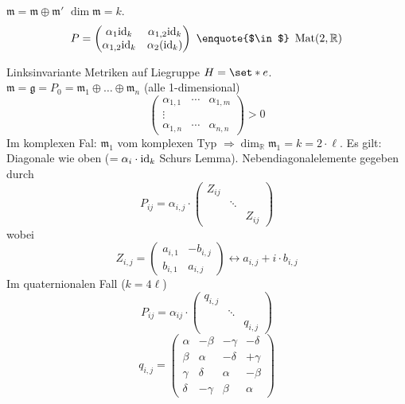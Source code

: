 \begin{beispiel*}
	$\mathfrak{m} = \mathfrak{m} \oplus \mathfrak{m}'$ $\dim \mathfrak{m} = k$.
	\[
		P = \begin{pmatrix}
			\alpha_1 {\id_k} & \alpha_{1,2} {\id_k} \\
			\alpha_{1,2} {\id_k} & \alpha_2 (\id_k)
		\end{pmatrix}
		\text{ \enquote{$\in$} } \Mat(2,\mathbb{R})
	\]
\end{beispiel*}

Linksinvariante Metriken auf Liegruppe $H=\set*{e}$. $\mathfrak{m} = \mathfrak{g} = P_0 = \mathfrak{m}_1 \oplus \ldots \oplus \mathfrak{m}_n$ (alle 1-dimensional)
\[
	\begin{pmatrix}
		\alpha_{1,1} & \cdots & \alpha_{1,m} \\
		\vdots & & \\
		\alpha_{1,n} & \cdots & \alpha_{n,n}
	\end{pmatrix} > 0
\]
Im komplexen Fal: $\mathfrak{m}_1$ vom komplexen Typ $\Rightarrow \dim_\mathbb{R} \mathfrak{m}_1 = k = 2 \cdot \ell$.
Es gilt: Diagonale wie oben ($= \alpha_i \cdot {\operatorname{id}_k}$ Schurs Lemma). 
Nebendiagonalelemente gegeben durch 
\[
	P_{ij} = \alpha_{i,j} \cdot \begin{pmatrix}
		Z_{ij} & & \\
		& \ddots & \\
		& & Z_{ij}
	\end{pmatrix}
\]
wobei
\[
	Z_{i,j} = \begin{pmatrix}
		a_{i,1}  & -b_{i,j} \\
		b_{i,1} & a_{i,j}
	\end{pmatrix} \longleftrightarrow a_{i,j} + i \cdot b_{i,j}
\]
Im quaternionalen Fall ($k=4 \ell$)
\[
	P_{ij} = \alpha_{ij} \cdot \begin{pmatrix}
		q_{i,j} & & \\
		& \ddots & \\
		& & q_{i,j}
	\end{pmatrix}
\]
\[
	q_{i,j} = \begin{pmatrix}
		\alpha & -\beta & - \gamma & - \delta \\
		\beta & \alpha & - \delta & + \gamma \\
		\gamma & \delta & \alpha & - \beta \\
		\delta & -\gamma & \beta & \alpha
	\end{pmatrix}
\]


